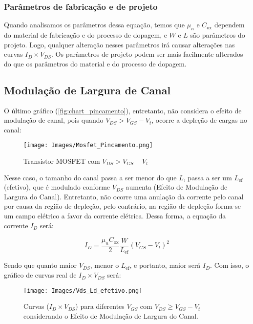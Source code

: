 \documentclass[12pt]{article}
\begin{document}
\subsubsection{Parâmetros de fabricação e de projeto}

Quando analisamos os parâmetros dessa equação, temos que $\mu_n$ e $C_{\text{ox}}$ dependem do material de fabricação e do processo de dopagem, e $W$ e $L$ são parâmetros do projeto. Logo, qualquer alteração nesses parâmetros irá causar alterações nas curvas $I_D \times V_{DS}$.
Os parâmetros de projeto podem ser mais facilmente alterados do que os parâmetros do material e do processo de dopagem.

\subsection{Modulação de Largura de Canal}

O último gráfico (\ref{fig:chart_pincamento}), entretanto, não considera o efeito de modulação de canal, pois quando $V_{DS} > V_{GS} - V_t$, ocorre a depleção de cargas no canal:

\begin{figure}[H]
  \begin{center}
    \texttt{[image: Images/Mosfet\_Pincamento.png]}
  \end{center}
  \caption{Transistor MOSFET com $V_{DS} > V_{GS} - V_t$}
\end{figure}

Nesse caso, o tamanho do canal passa a ser menor do que $L$, passa a ser um $L_{\text{ef}}$ (efetivo), que é modulado conforme $V_{DS}$ aumenta (Efeito de Modulação de Largura do Canal). Entretanto, não ocorre uma anulação da corrente pelo canal por causa da região de depleção, pelo contrário, na região de depleção forma-se um campo elétrico a favor da corrente elétrica. Dessa forma, a equação da corrente $I_D$ será:

$$
  I_D = \frac{\mu_n C_{\text{ox}}}{2} \frac{W}{L_{\text{ef}}} (V_{GS} - V_t)^2
$$

Sendo que quanto maior $V_{DS}$, menor o $L_{\text{ef}}$, e portanto, maior será $I_D$. Com isso, o gráfico de curvas real de $I_D \times V_{DS}$ será:

\begin{figure}[H]
  \begin{center}
    \texttt{[image: Images/Vds\_Ld\_efetivo.png]}
  \end{center}
  \caption{Curvas ($I_D \times V_{DS}$) para diferentes $V_{GS}$ com $V_{DS} \geq V_{GS} - V_t$ considerando o Efeito de Modulação de Largura do Canal.}
\end{figure}
\end{document}
